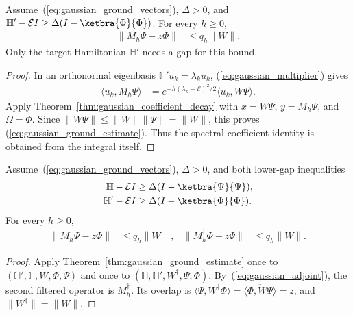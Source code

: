 \begin{theorem}
    \label{thm:gaussian_ground_estimate}
    \leanok
    Assume~(\ref{eq:gaussian_ground_vectors}), $\Delta>0$, and
    $\mathbb H'-\mathcal E I\ge\Delta(I-\ketbra{\Phi}{\Phi})$.
    For every $h\ge0$,
    \begin{align}
        \|M_h\Psi-z\Phi\|&\le q_h\|W\|.
        \label{eq:gaussian_ground_estimate}
    \end{align}
    Only the target Hamiltonian $\mathbb H'$ needs a gap for this bound.
\end{theorem}
\begin{proof}\leanok
    In an orthonormal eigenbasis $\mathbb H'u_k=\lambda_ku_k$,
    (\ref{eq:gaussian_multiplier}) gives
    \begin{align}
        \langle u_k,M_h\Psi\rangle
            &=e^{-h(\lambda_k-\mathcal E)^2/2}
                \langle u_k,W\Psi\rangle.
        \label{eq:gaussian_ground_coefficients}
    \end{align}
    Apply Theorem~\ref{thm:gaussian_coefficient_decay} with
    $x=W\Psi$, $y=M_h\Psi$, and $\Omega=\Phi$.
    Since $\|W\Psi\|\le\|W\|\|\Psi\|=\|W\|$, this proves
    (\ref{eq:gaussian_ground_estimate}). Thus the spectral coefficient
    identity is obtained from the integral itself.
\end{proof}

\begin{theorem}
    \label{thm:gaussian_two_sided}
    \leanok
    Assume~(\ref{eq:gaussian_ground_vectors}), $\Delta>0$, and both
    lower-gap inequalities
    \begin{align}
        \mathbb H-\mathcal E I&\ge\Delta(I-\ketbra{\Psi}{\Psi}),
        \label{eq:gaussian_two_gaps}\\
        \mathbb H'-\mathcal E I&\ge\Delta(I-\ketbra{\Phi}{\Phi}). \notag
    \end{align}
    For every $h\ge0$,
    \begin{align}
        \|M_h\Psi-z\Phi\|&\le q_h\|W\|, &
        \|M_h^\dagger\Phi-\overline z\Psi\|&\le q_h\|W\|.
        \label{eq:gaussian_two_sided}
    \end{align}
\end{theorem}
\begin{proof}\leanok
    Apply Theorem~\ref{thm:gaussian_ground_estimate} once to
    $(\mathbb H',\mathbb H,W,\Phi,\Psi)$ and once to
    $(\mathbb H,\mathbb H',W^\dagger,\Psi,\Phi)$.
    By~(\ref{eq:gaussian_adjoint}), the second filtered operator is
    $M_h^\dagger$. Its overlap is
    $\langle\Psi,W^\dagger\Phi\rangle
      =\overline{\langle\Phi,W\Psi\rangle}=\overline z$, and
    $\|W^\dagger\|=\|W\|$.
\end{proof}

